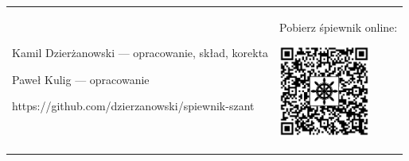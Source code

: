 \documentclass[11pt, twoside]{book}
\begin{document}
\tableofcontents
\vfill
\renewcommand{\tabularxcolumn}[1]{>{\small}b{#1}}
\begin{tabularx}{\textwidth}{%
        @{}
        >{\raggedright\arraybackslash}X
        @{}
        >{\raggedleft\arraybackslash}X
    }
    \footnotesize
    Kamil Dzierżanowski --- opracowanie, skład, korekta

    Paweł Kulig --- opracowanie

    \medskip

    https://github.com/dzierzanowski/spiewnik-szant

    &

    Pobierz śpiewnik online:

    \includegraphics[width=3cm]{images/qr.png}
\end{tabularx}

\end{document}
